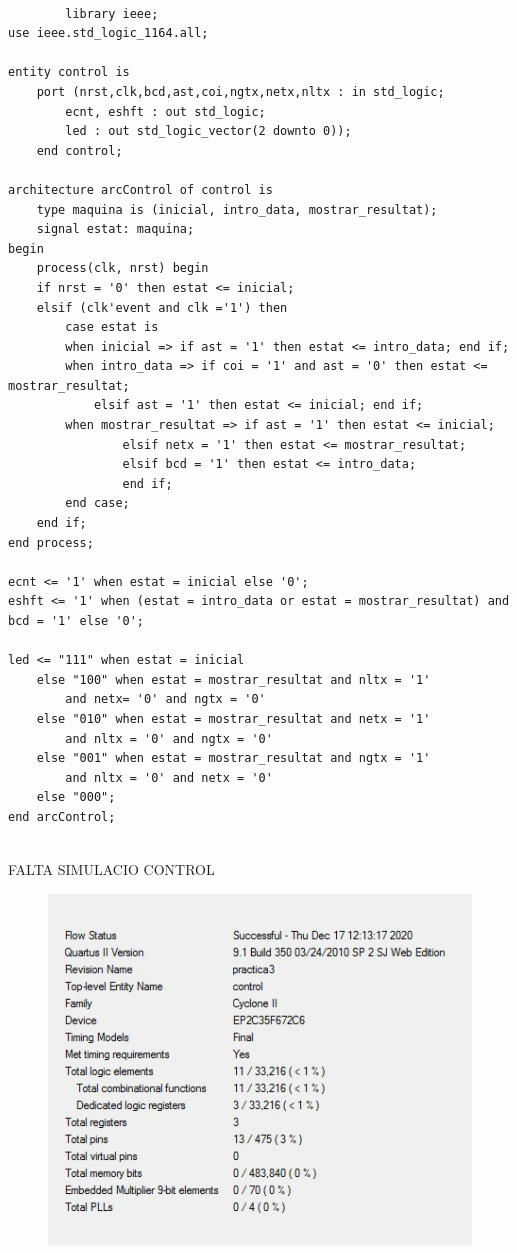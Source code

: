 \documentclass[12pt, a4papre]{article}
\begin{document}
		\begin{lstlisting}[style=vhdl, frame=single, basicstyle=\tiny]
		
		library ieee;
use ieee.std_logic_1164.all;

entity control is
	port (nrst,clk,bcd,ast,coi,ngtx,netx,nltx : in std_logic;
		ecnt, eshft : out std_logic;
		led : out std_logic_vector(2 downto 0));
	end control;

architecture arcControl of control is 
	type maquina is (inicial, intro_data, mostrar_resultat);
	signal estat: maquina;
begin
	process(clk, nrst) begin
	if nrst = '0' then estat <= inicial;
	elsif (clk'event and clk ='1') then
	    case estat is 
	    when inicial => if ast = '1' then estat <= intro_data; end if;
	    when intro_data => if coi = '1' and ast = '0' then estat <= mostrar_resultat;
			elsif ast = '1' then estat <= inicial; end if;
	    when mostrar_resultat => if ast = '1' then estat <= inicial;
				elsif netx = '1' then estat <= mostrar_resultat;
				elsif bcd = '1' then estat <= intro_data;
				end if;
	    end case;
	end if;
end process;

ecnt <= '1' when estat = inicial else '0';
eshft <= '1' when (estat = intro_data or estat = mostrar_resultat) and bcd = '1' else '0';
			
led <= "111" when estat = inicial 
    else "100" when estat = mostrar_resultat and nltx = '1' 
        and netx= '0' and ngtx = '0'
    else "010" when estat = mostrar_resultat and netx = '1' 
    	and nltx = '0' and ngtx = '0'
    else "001" when estat = mostrar_resultat and ngtx = '1' 
    	and nltx = '0' and netx = '0'
    else "000";
end arcControl;
		
		\end{lstlisting}
		
		FALTA SIMULACIO CONTROL

	
	
	\begin{figure}[H]
		\begin{center}
		\includegraphics[width=130mm]{informeControl.jpeg}
		\end{center}
	\end{figure}	
		
\end{document}
